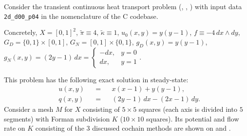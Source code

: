 \begin{example}
  \label{cmc/diffusion/continuous/transient/examples/2d_d00_p04-example}
  Consider the transient continuous heat transport problem
  (,
   ,
   )
  with input data \verb|2d_d00_p04| in the nomenclature of the C codebase.

  Concretely,
    $X = [0, 1]^2$,
    $\tilde{\pi} \equiv 4$,
    $\tilde{\kappa} \equiv 1$,
    $u_0(x, y) = y (y - 1)$,
    $f \equiv -4\, d x \wedge d y$,
    $G_D = \{0, 1\} \times [0, 1]$,
    $G_N = [0, 1] \times \{0, 1\}$,
    $g_D(x, y) = y (y - 1)$,
    $g_N(x, y) = (2 y - 1) \, d x =
      \begin{cases}
        - d x, & y = 0 \\
          d x, & y = 1
      \end{cases}
    $.

  This problem has the following exact solution in steady-state:
  \begin{subequations}
    \begin{alignat}{3}
      & u(x, y) && = && x (x - 1) + y ( y - 1), \\
      & q(x, y) && = && (2 y - 1)\, d x - (2 x - 1)\, d y.
    \end{alignat}
  \end{subequations}
  Consider a mesh $M$ for $X$ consisting of $5 \times 5$ squares (each axis is
  divided into $5$ segments) with Forman subdivision $K$
  ($10 \times 10$ squares).
  Its potential and flow rate on $K$ consisting of the $3$ discussed cochain
  methods are shown on
  and
  .
\end{example}
